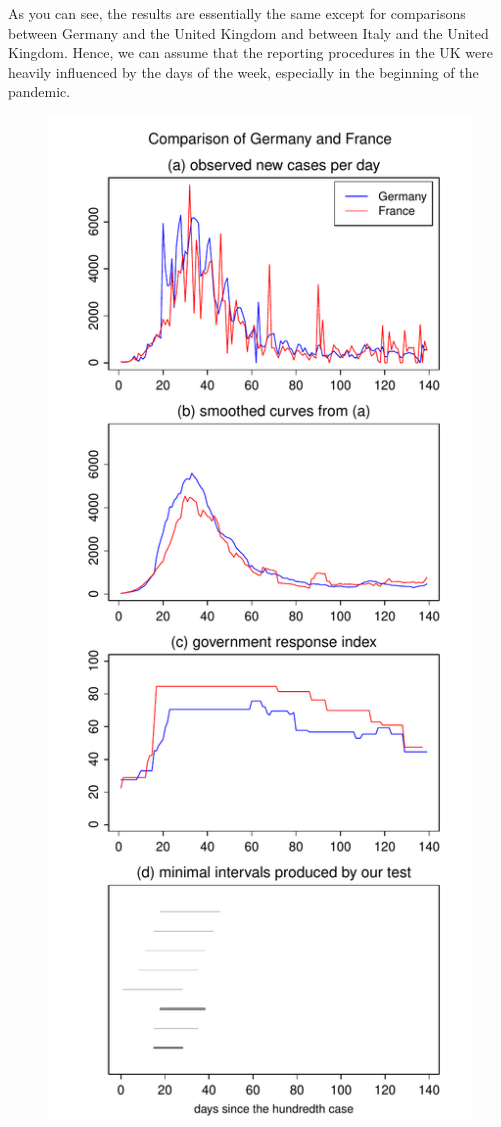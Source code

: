 \documentclass[a4paper,12pt]{article}
\numberwithin{equation}{section}
\begin{document}
As you can see, the results are essentially the same except for comparisons between Germany and the United Kingdom and between Italy and the United Kingdom. Hence, we can assume that the reporting procedures in the UK were heavily influenced by the days of the week, especially in the beginning of the pandemic.


\begin{figure}[h!]
\begin{minipage}[t]{0.49\textwidth}
\includegraphics[width=\textwidth]{plots/DEU_vs_FRA}

\end{minipage}
\end{figure}
\end{document}
